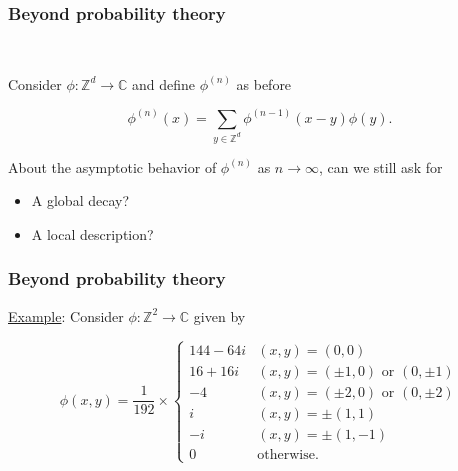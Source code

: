 \documentclass{beamer}
\theoremstyle{definition}
\begin{document}
\begin{frame}
\frametitle{Beyond probability theory}


\begin{center}
	\textcolor{blue}{}\\
\end{center}



Consider $\phi: \mathbb{Z}^d \to \mathbb{C}$ and define $\phi^{(n)}$ as before

\begin{equation*}
\phi^{(n)}(x)=\sum_{y\in\mathbb{Z}^d}\phi^{(n-1)}(x-y)\phi(y).
\end{equation*}

%


About the asymptotic behavior of $\phi^{(n)}$ as $n\to \infty$, can we still ask for
\begin{itemize}
	\item A global decay?
	\item A local description?
\end{itemize}



\end{frame}





















\begin{frame}
\frametitle{Beyond probability theory}



\underline{Example}: Consider $\phi: \mathbb{Z}^2 \to \mathbb{C}$ given by

\begin{equation*}
\phi(x,y) =
\frac{1}{192}\times
\begin{cases}
144 - 64i &(x,y) = (0,0)\\
16 + 16i &(x,y) = (\pm 1, 0)\mbox{ or }(0,\pm 1)\\
-4        &(x,y) = (\pm 2,0)\mbox{ or }(0,\pm 2)\\
i   &(x,y) = \pm(1,1)\\
-i   &(x,y) = \pm(1,-1)\\
0& \text{otherwise}.
\end{cases}
\end{equation*}

\end{frame}
\end{document}
